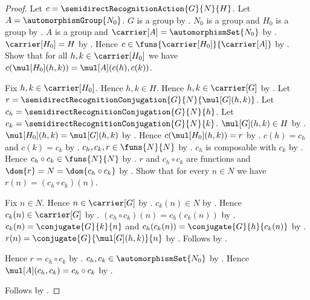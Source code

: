 \begin{proof}
    Let $c=\semidirectRecognitionAction{G}{N}{H}$.
    Let $A=\automorphismGroup{N_0}$.
    $G$ is a group by .
    $N_0$ is a group and $H_0$ is a group by
        .
    $A$ is a group and $\carrier[A]=\automorphismSet{N_0}$ by
        .
    $\carrier[H_0]=H$ by .
    Hence $c\in\funs{\carrier[H_0]}{\carrier[A]}$ by
        .
    Show that for all $h,k\in\carrier[H_0]$ we have
        $c(\mul[H_0](h,k))=\mul[A](c(h),c(k))$.
    \begin{subproof}
        Fix $h,k\in\carrier[H_0]$.
        Hence $h,k\in H$.
        Hence $h,k\in\carrier[G]$ by
            .
        Let $r=\semidirectRecognitionConjugation
            {G}{N}{\mul[G](h,k)}$.
        Let $c_h=\semidirectRecognitionConjugation{G}{N}{h}$.
        Let $c_k=\semidirectRecognitionConjugation{G}{N}{k}$.
        $\mul[G](h,k)\in H$ by .
        $\mul[H_0](h,k)=\mul[G](h,k)$ by
            .
        Hence $c(\mul[H_0](h,k))=r$ by
            .
        $c(h)=c_h$ and $c(k)=c_k$ by
            .
        $c_h,c_k,r\in\funs{N}{N}$ by
            .
        $c_h$ is composable with $c_k$ by
            .
        Hence $c_h\circ c_k\in\funs{N}{N}$ by .
        $r$ and $c_h\circ c_k$ are functions and
            $\dom{r}=N=\dom{c_h\circ c_k}$ by
            .
        Show that for every $n\in N$ we have
            $r(n)=(c_h\circ c_k)(n)$.
        \begin{subproof}
            Fix $n\in N$.
            Hence $n\in\carrier[G]$ by
                .
            $c_k(n)\in N$ by .
            Hence $c_k(n)\in\carrier[G]$ by
                .
            $(c_h\circ c_k)(n)=c_h(c_k(n))$ by
                .
            $c_k(n)=\conjugate{G}{k}{n}$ and
                $c_h(c_k(n))=\conjugate{G}{h}{c_k(n)}$ by
                .
            $r(n)=\conjugate{G}{\mul[G](h,k)}{n}$ by
                .
            Follows by .
        \end{subproof}
        Hence $r=c_h\circ c_k$ by .
        $c_h,c_k\in\automorphismSet{N_0}$ by
            .
        Hence $\mul[A](c_h,c_k)=c_h\circ c_k$ by
            .
    \end{subproof}
    Follows by .
\end{proof}

